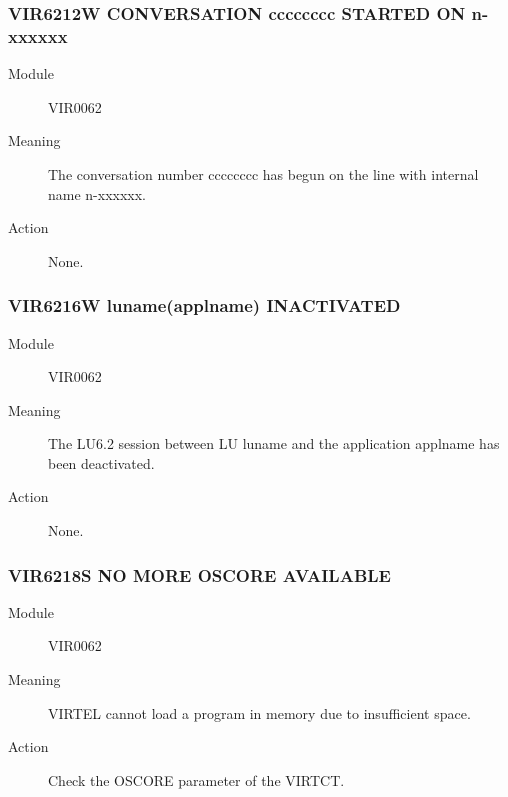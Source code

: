 \documentclass[letterpaper,10pt,english]{sphinxmanual}
\begin{document}
\subsubsection{VIR6212W CONVERSATION cccccccc STARTED  ON n-xxxxxx}
\label{\detokenize{messages:vir6212w-conversation-cccccccc-started-on-n-xxxxxx}}\begin{description}
\item[{Module}] \leavevmode
VIR0062

\item[{Meaning}] \leavevmode
The conversation number cccccccc has begun on the line with internal name n-xxxxxx.

\item[{Action}] \leavevmode
None.

\end{description}


\subsubsection{VIR6216W luname(applname) INACTIVATED}
\label{\detokenize{messages:vir6216w-luname-applname-inactivated}}\begin{description}
\item[{Module}] \leavevmode
VIR0062

\item[{Meaning}] \leavevmode
The LU6.2 session between LU luname and the application applname has been deactivated.

\item[{Action}] \leavevmode
None.

\end{description}


\subsubsection{VIR6218S NO MORE OSCORE AVAILABLE}
\label{\detokenize{messages:vir6218s-no-more-oscore-available}}\begin{description}
\item[{Module}] \leavevmode
VIR0062

\item[{Meaning}] \leavevmode
VIRTEL cannot load a program in memory due to insufficient space.

\item[{Action}] \leavevmode
Check the OSCORE parameter of the VIRTCT.

\end{description}
\end{document}
